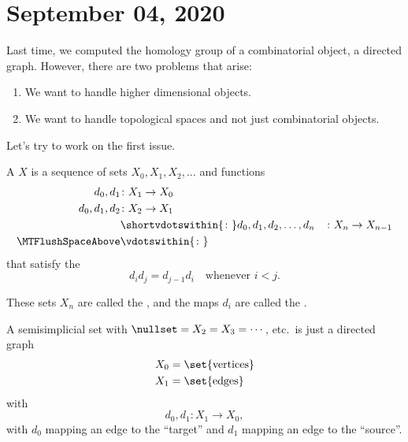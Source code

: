 \documentclass{standalone}
\begin{document}
\chapter{September 04, 2020}
Last time, we computed the homology group of a combinatorial object,
a directed graph. However, there are two problems that arise:
\begin{enumerate}
  \item We want to handle higher dimensional objects.
  \item We want to handle topological spaces and
  not just combinatorial objects.
\end{enumerate}

Let's try to work on the first issue.
\begin{definition}
  A  \(X\) is
    a sequence of sets \(X_0, X_1, X_2, \dots\) and
    functions
    \begin{align*}
      d_0, d_1 &\colon X_1 \to X_0 \\
      d_0, d_1, d_2 &\colon X_2 \to X_1 \\
      &\shortvdotswithin{\colon}
      d_0, d_1, d_2, \dots, d_n &\colon X_n \to X_{n-1} \\
      \MTFlushSpaceAbove
      &\vdotswithin{\colon}
    \end{align*}
  that satisfy the 
  \[
    d_i d_j = d_{j - 1} d_i \quad
    \text{whenever \(i < j\)}.
  \]

  These sets \(X_n\) are called the , and the maps
  \(d_i\) are called the .
\end{definition}

\begin{example}
  A semisimplicial set with \(\nullset = X_2 = X_3 = \cdots\), etc.\
  is just a directed graph
  \begin{align*}
    X_0 &= \set{\text{vertices}} \\
    X_1 &= \set{\text{edges}}
  \end{align*}
  with
  \[
    d_0, d_1 \colon X_1 \to X_0,
  \]
  with \(d_0\) mapping an edge to the ``target''
  and \(d_1\) mapping an edge to the ``source''.
\end{example}
\end{document}
